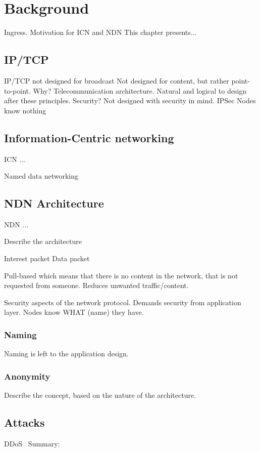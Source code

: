 \chapter{Background}\label{chp:background} 
Ingress. 
Motivation for ICN and NDN
This chapter presents...

\section{IP/TCP}
IP/TCP not designed for broadcast
Not designed for content, but rather point-to-point. 
Why? Telecommunication architecture. 
Natural and logical to design after these principles.
Security? Not designed with security in mind. IPSec
Nodes know nothing

\section{Information-Centric networking}\label{chp2:sec:icn}
\gls{ICN} ...


Named data networking~\cite{DBLP:journals/ccr/0001ABJcCPWZ14}

\section{NDN Architecture}\label{chp2:sec:ndn_architecture}
\gls{NDN} ...

Describe the architecture ~\cite{NDN-0021}

Interest packet
Data packet

Pull-based which means that there is no content in the network, that is not requested from someone.
Reduces unwanted traffic/content. 

Security aspects of the network protocol. 
Demands security from application layer.
Nodes know WHAT (name) they have. 

\subsection{Naming}
Naming is left to the application design.

\subsection{Anonymity}
Describe the concept, based on the nature of the architecture.

\section{Attacks}
DDoS~\cite{DBLP:conf/icccn/GastiTU013}
Summary:


